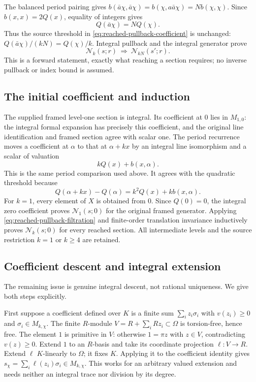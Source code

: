 The balanced period pairing gives
$b(\bar a\chi,\bar a\chi)=b(\chi,a\bar a\chi)=Nb(\chi,\chi)$.
Since $b(x,x)=2Q(x)$, equality of integers gives
\[
                 Q(\bar a\chi)=NQ(\chi).
\]
Thus the source threshold in \eqref{eq:reached-pullback-coefficient}
is unchanged:
$Q(\bar a\chi)/(kN)=Q(\chi)/k$.
Integral pullback and the integral generator prove
\begin{equation}\label{eq:reached-pullback-filtration}
       \mathcal N_k(s;r)\ \Longrightarrow\
       \mathcal N_{kN}(s';r).
\end{equation}
This is a forward statement, exactly what reaching a section requires;
no inverse pullback or index bound is assumed.

\subsection*{The initial coefficient and induction}

The supplied framed level-one section is integral.  Its coefficient at
$0$ lies in $M_{1,0}$: the integral formal expansion has precisely this
coefficient, and the original line identification and framed section
agree with scalar one.  The period recurrence moves a coefficient at
$\alpha$ to that at $\alpha+kx$ by an integral line isomorphism and a
scalar of valuation
\[
                         kQ(x)+b(x,\alpha).
\]
This is the same period comparison used above.  It agrees with the
quadratic threshold because
\[
 Q(\alpha+kx)-Q(\alpha)=k^2Q(x)+kb(x,\alpha).
\]
For $k=1$, every element of $X$ is obtained from $0$.  Since $Q(0)=0$,
the integral zero coefficient proves $\mathcal N_1(s;0)$ for the
original framed generator.  Applying
\eqref{eq:reached-pullback-filtration} and finite-order translation
invariance inductively proves $\mathcal N_k(s;0)$ for every reached
section.  All intermediate levels and the source restriction
$k=1$ or $k\geq4$ are retained.

\subsection*{Coefficient descent and integral extension}

The remaining issue is genuine integral descent, not rational
uniqueness.  We give both steps explicitly.

First suppose a coefficient defined over $K$ is a finite sum
$\sum_i z_i\sigma_i$ with $v(z_i)\geq0$ and
$\sigma_i\in M_{k,\chi}$.  The finite $R$-module
$V=R+\sum_iRz_i\subset\Omega$ is torsion-free, hence free.
The element $1$ is primitive in $V$: otherwise
$1=\pi z$ with $z\in V$, contradicting $v(z)\geq0$.
Extend $1$ to an $R$-basis and take its coordinate projection
$\ell:V\to R$.  Extend $\ell$ $K$-linearly to $\Omega$; it fixes $K$.
Applying it to the coefficient identity gives
$s_\chi=\sum_i\ell(z_i)\sigma_i\in M_{k,\chi}$.
This works for an arbitrary valued extension and needs neither an
integral trace nor division by its degree.

